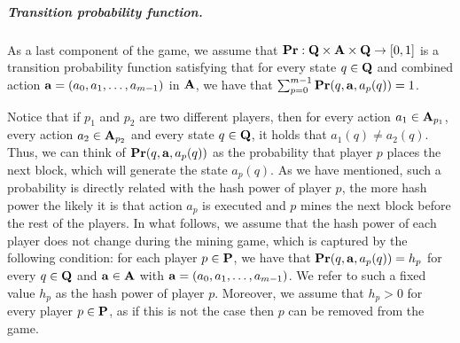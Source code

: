 \subparagraph*{Transition probability function.} %
As a last component of the game, we assume that $\mathbf{Pr} : \mathbf{Q} \times \mathbf{A} \times \mathbf{Q} \to [0,1]$ is a transition probability function satisfying that for every state $q \in \mathbf{Q}$ and combined action $\mathbf{a} = (a_0, a_1, \ldots, a_{m-1})$ in $\mathbf{A}$, we have that $\sum_{p=0}^{m-1} \mathbf{Pr}(q, \mathbf{a}, a_p(q)) = 1$.

Notice that if $p_1$ and $p_2$ are two different players, then for every action $a_1 \in \mathbf{A}_{p_1}$, every action $a_2 \in \mathbf{A}_{p_2}$ and every state $q \in \mathbf{Q}$, it holds that $a_1(q) \neq a_2(q)$. Thus, we can think of $\mathbf{Pr}(q, \mathbf{a}, a_p(q))$ as the probability that player $p$ places the next block, which will generate the state $a_p(q)$. As we have mentioned, such a probability is directly related with the hash power of player $p$, the more hash power the likely it is that action $a_p$ is executed and $p$ mines the next block before the rest of the players. In what follows, we assume that the hash power of each player does not change during the mining game, which is captured by the following condition:
for each player $p \in \mathbf{P}$, we 
have that $\mathbf{Pr}(q, \mathbf{a}, a_p(q)) = h_p$ for every $q \in \mathbf{Q}$ and $\mathbf{a} \in \mathbf{A}$ with $\mathbf{a} = (a_0, a_1, \ldots, a_{m-1})$. We refer to such a fixed value $h_p$ 
as the hash power of player $p$.
Moreover, we assume that $h_p > 0$ for every player $p \in \mathbf{P}$, as if this is not the case then $p$ can be removed from the game.


